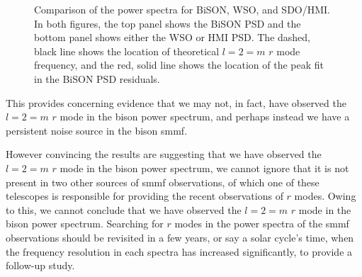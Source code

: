 \begin{figure}[!ht]
	\centering
	\qquad
	\caption{Comparison of the power spectra for BiSON, WSO, and SDO/HMI. In both figures, the top panel shows the BiSON PSD and the bottom panel shows either the WSO or HMI PSD. The dashed, black line shows the location of theoretical $l=2=m$ $r$ mode frequency, and the red, solid line shows the location of the peak fit in the BiSON PSD residuals.}  \label{fig:comparing_SMMF_PSDs}
\end{figure}

This provides concerning evidence that we may not, in fact, have observed the $l=2=m$ $r$ mode in the \gls{bison} power spectrum, and perhaps instead we have a persistent noise source in the \gls{bison} \gls{smmf}.

However convincing the results are suggesting that we have observed the $l=2=m$ $r$ mode in the \gls{bison} power spectrum, we cannot ignore that it is not present in two other sources of \gls{smmf} observations, of which one of these telescopes is responsible for providing the recent observations of $r$ modes. Owing to this, we cannot conclude that we have observed the $l=2=m$ $r$ mode in the \gls{bison} power spectrum. Searching for $r$ modes in the power spectra of the \gls{smmf} observations should be revisited in a few years, or say a solar cycle's time, when the frequency resolution in each spectra has increased significantly, to provide a follow-up study.


